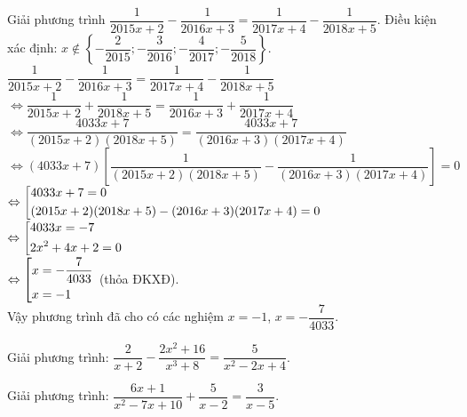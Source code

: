 \begin{bt}%
	Giải phương trình $\dfrac{1}{2015x+2} - \dfrac{1}{2016x+3} = \dfrac{1}{2017x+4} - \dfrac{1}{2018x+5}$.
	\loigiai
	{
		Điều kiện xác định: $x \not \in \left\{-\dfrac{2}{2015}; -\dfrac{3}{2016}; -\dfrac{4}{2017}; -\dfrac{5}{2018}\right\}$.\\
		\hspace*{0.6cm} $\dfrac{1}{2015x+2} - \dfrac{1}{2016x+3} = \dfrac{1}{2017x+4} - \dfrac{1}{2018x+5}$\\
		$\Leftrightarrow \dfrac{1}{2015x+2} + \dfrac{1}{2018x+5} = \dfrac{1}{2016x+3} + \dfrac{1}{2017x+4}$\\
		$\Leftrightarrow \dfrac{4033x + 7}{(2015x + 2)(2018x + 5)} = \dfrac{4033x + 7}{(2016x + 3)(2017x + 4)}$\\
		$\Leftrightarrow (4033x + 7)\left[ \dfrac{1}{(2015x + 2)(2018x + 5)} - \dfrac{1}{(2016x + 3)(2017x + 4)}\right] = 0$\\
		$\Leftrightarrow \left[\begin{aligned}& 4033x + 7 = 0 \\& (2015x + 2)(2018x + 5) - (2016x + 3)(2017x + 4) = 0\end{aligned}\right.$\\
		$\Leftrightarrow \left[\begin{aligned}& 4033x = -7 \\& 2x^2 + 4x + 2 = 0\end{aligned}\right.$\\
		$\Leftrightarrow \left[\begin{aligned}& x = -\dfrac{7}{4033} \\& x = -1\end{aligned}\right.$ (thỏa ĐKXĐ).\\
		Vậy phương trình đã cho có các nghiệm $x = -1$, $x = -\dfrac{7}{4033}$.
	}
\end{bt}
\begin{bt}%
	Giải phương trình: $\dfrac{2}{x+2}-\dfrac{2x^2+16}{x^3+8}=\dfrac{5}{x^2-2 x+4}$.
\end{bt}
\begin{bt}%
	Giải phương trình: $\dfrac{6x+1}{x^2-7x+10}+\dfrac{5}{x-2}=\dfrac{3}{x-5}$.
\end{bt}

